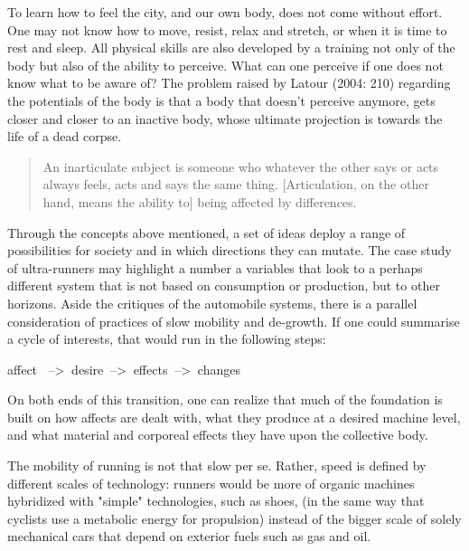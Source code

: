 To learn how to feel the city, and our own body, does not come without effort. One may not know how to move, resist, relax and stretch, or when it is time to rest and sleep. All physical skills are also developed by a training not only of the body but also of the ability to perceive. What can one perceive if one does not know what to be aware of? The problem raised by Latour (2004: 210) regarding the potentials of the body is that a body that doesn't perceive anymore, gets closer and closer to an inactive body, whose ultimate projection is towards the life of a dead corpse.

\begin{quote}
 An inarticulate subject is someone who whatever the other says or acts always feels, acts and says the same thing. [Articulation, on the other hand, means the ability to] being affected by differences.
\end{quote}

Through the concepts above mentioned, a set of ideas deploy a range of possibilities for society and in which directions they can mutate. The case study of ultra-runners may highlight a number a variables that look to a perhaps different system that is not based on consumption or production, but  to other horizons. Aside the critiques of the automobile systems, there is a parallel consideration of practices of slow mobility and de-growth. If one could summarise a cycle of interests, that would run in the following steps:


\begin{center}
 affect $ \> $ --> $ \> $desire $ \> $--> $ \> $effects $ \> $--> $ \> $changes
\end{center}

On both ends of this transition, one can realize that much of the foundation is built on how affects are dealt with, what they produce at a desired machine level, and what material and corporeal effects they have upon the collective body.

The mobility of running is not that slow per se. Rather, speed is defined by different scales of technology: runners would be more of organic machines hybridized with "simple" technologies, such as shoes, (in the same way that cyclists use a metabolic energy for propulsion) instead of the bigger scale of solely mechanical cars that depend on exterior fuels such as gas and oil.


